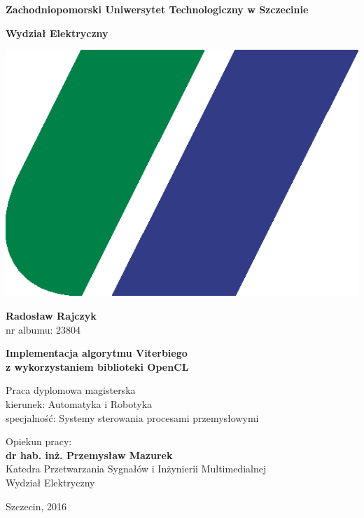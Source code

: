 \documentclass[document.tex]{subfiles}
\begin{document}
\begin{center}
\huge{\textbf{Zachodniopomorski Uniwersytet Technologiczny w Szczecinie}}

\LARGE{\textbf{Wydział Elektryczny}}

\vspace{0.5cm}
\includegraphics[scale=0.2]{imgs/logoNew.png}

\vspace{1cm}
\Large{\textbf{Radosław Rajczyk}} \\
\large{nr albumu: 23804}

\vspace{1cm}
\Large{\textbf{	Implementacja algorytmu Viterbiego 
\\z wykorzystaniem biblioteki OpenCL  }}

\vspace{1cm}
\large{Praca dyplomowa magisterska \\
kierunek: Automatyka i Robotyka \\
specjalność: Systemy sterowania procesami przemysłowymi}
\end{center}

\vspace{4cm}
\begin{flushright}
\large{Opiekun pracy:\\
\textbf{dr hab. inż. Przemysław Mazurek} \\
Katedra Przetwarzania Sygnałów i Inżynierii Multimedialnej\\
Wydział Elektryczny}
\end{flushright}

\vspace{2cm}
\begin{center}
\Large{Szczecin, 2016}
\end{center}
\end{document}
